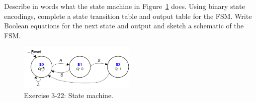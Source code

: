 \documentclass[12pt]{article}
\newenvironment{ex}[2][Exercise]{\begin{trivlist}
		\item[\hskip \labelsep {\bfseries #1}\hskip \labelsep {\bfseries #2.}]}{\end{trivlist}}
\begin{document}
\begin{ex}{3.22}
	Describe in words what the state machine in Figure~\ref{03-22-state-machine} does. Using binary state encodings, complete
	a state transition table and output table for the FSM. Write Boolean equations for the next state and output
	and sketch a schematic of the FSM.
	\begin{figure}
		\centering
		\includegraphics[width=0.5\textwidth]{03-22-state-machine}
		\caption{Exercise 3-22: State machine.}
		\label{03-22-state-machine}
	\end{figure}
\end{ex}
\end{document}
